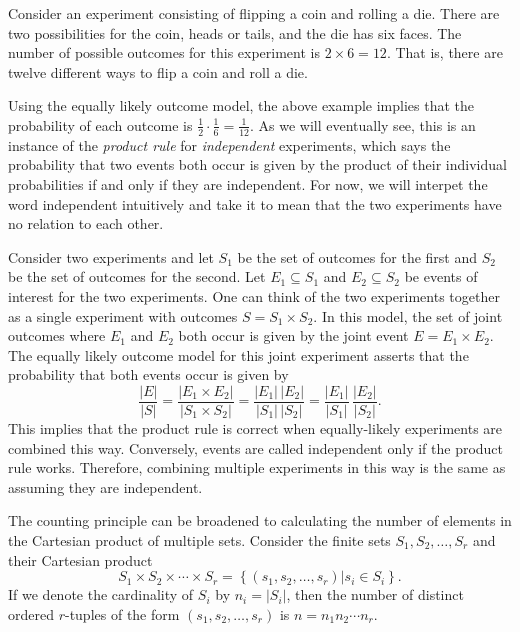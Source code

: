 \begin{example}
Consider an experiment consisting of flipping a coin and rolling a die.
There are two possibilities for the coin, heads or tails, and the die has six faces.
The number of possible outcomes for this experiment is $2 \times 6 = 12$.
That is, there are twelve different ways to flip a coin and roll a die.
\end{example}

Using the equally likely outcome model, the above example implies that the probability of each outcome is $\frac{1}{2} \cdot \frac{1}{6} = \frac{1}{12}$.
As we will eventually see, this is an instance of the \emph{product rule} for \emph{independent} experiments, which says the probability that two events both occur is given by the product of their individual probabilities if and only if they are independent.
For now, we will interpet the word independent intuitively and take it to mean that the two experiments have no relation to each other.

\begin{example}
Consider two experiments and let $S_1$ be the set of outcomes for the first and $S_2$ be the set of outcomes for the second.
Let $E_1 \subseteq S_1$ and $E_2 \subseteq S_2$ be events of interest for the two experiments.
One can think of the two experiments together as a single experiment with outcomes $S = S_1 \times S_2$.
In this model, the set of joint outcomes where $E_1$ and $E_2$ both occur is given by the joint event $E = E_1 \times E_2$.
The equally likely outcome model for this joint experiment asserts that the probability that both events occur is given by
\[ \frac{|E|}{|S|} = \frac{|E_1 \times E_2|}{|S_1 \times S_2|} = \frac{|E_1|\,|E_2|}{|S_1|\,|S_2|} = \frac{|E_1|}{|S_1|}\,\frac{|E_2|}{|S_2|}. \]
This implies that the product rule is correct when equally-likely experiments are combined this way.
Conversely, events are called independent only if the product rule works.
Therefore, combining multiple experiments in this way is the same as assuming they are independent.
\end{example}

The counting principle can be broadened to calculating the number of elements in the Cartesian product of multiple sets.
Consider the finite sets $S_1, S_2, \ldots, S_r$ and their Cartesian product
\begin{equation*}
S_1 \times S_2 \times \cdots \times S_r
= \left\{ (s_1, s_2, \ldots, s_r) | s_i \in S_i \right\} .
\end{equation*}
If we denote the cardinality of $S_i$ by $n_i = | S_i |$, then the number of distinct ordered $r$-tuples of the form $(s_1, s_2, \ldots, s_r)$ is $n = n_1 n_2 \cdots n_r$.

